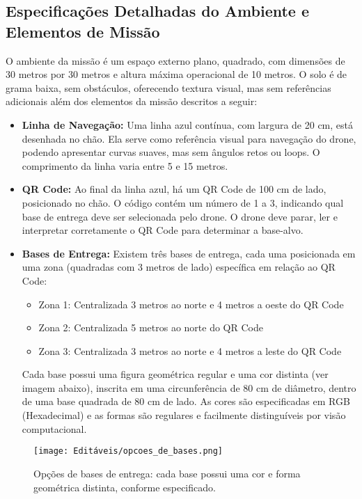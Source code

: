 {\color{red}
\subsection{Especificações Detalhadas do Ambiente e Elementos de Missão}

O ambiente da missão é um espaço externo plano, quadrado, com dimensões de 30 metros por 30 metros e altura máxima operacional de 10 metros. O solo é de grama baixa, sem obstáculos, oferecendo textura visual, mas sem referências adicionais além dos elementos da missão descritos a seguir:

\begin{itemize}
    \item \textbf{Linha de Navegação:} Uma linha azul contínua, com largura de 20 cm, está desenhada no chão. Ela serve como referência visual para navegação do drone, podendo apresentar curvas suaves, mas sem ângulos retos ou loops. O comprimento da linha varia entre 5 e 15 metros.
    \item \textbf{QR Code:} Ao final da linha azul, há um QR Code de 100 cm de lado, posicionado no chão. O código contém um número de 1 a 3, indicando qual base de entrega deve ser selecionada pelo drone. O drone deve parar, ler e interpretar corretamente o QR Code para determinar a base-alvo.
    \item \textbf{Bases de Entrega:} Existem três bases de entrega, cada uma posicionada em uma zona (quadradas com 3 metros de lado) específica em relação ao QR Code:
    \begin{itemize}
        \item Zona 1: Centralizada 3 metros ao norte e 4 metros a oeste do QR Code
        \item Zona 2: Centralizada 5 metros ao norte do QR Code
        \item Zona 3: Centralizada 3 metros ao norte e 4 metros a leste do QR Code
    \end{itemize}
    Cada base possui uma figura geométrica regular e uma cor distinta (ver imagem abaixo), inscrita em uma circunferência de 80 cm de diâmetro, dentro de uma base quadrada de 80 cm de lado. As cores são especificadas em RGB (Hexadecimal) e as formas são regulares e facilmente distinguíveis por visão computacional.
\end{itemize}

\begin{figure}[H]
    \centering
    \texttt{[image: Editáveis/opcoes\_de\_bases.png]}
    \caption{\color{red}Opções de bases de entrega: cada base possui uma cor e forma geométrica distinta, conforme especificado.}
    \label{fig:opcoes_bases}
\end{figure}

}
